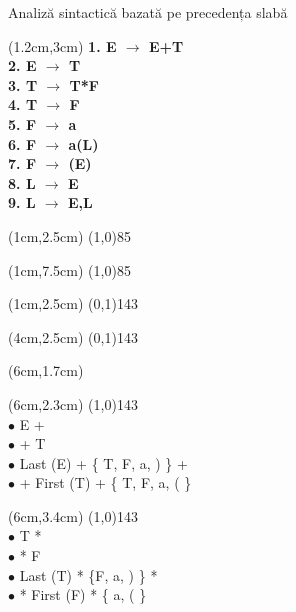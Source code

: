 \documentclass[pdf]{beamer}
\begin{document}
\begin{frame}{Analiză sintactică bazată pe precedența slabă}

\begin{textblock*}{16cm}(1.2cm,3cm)
\textbf
{1. E $\rightarrow$ E+T \\
2. E $\rightarrow$ T    \\
3. T $\rightarrow$ T*F  \\
4. T $\rightarrow$ F    \\ 
5. F $\rightarrow$ a    \\ 
6. F $\rightarrow$ a(L) \\
7. F $\rightarrow$ (E)   \\
8. L $\rightarrow$ E \\
9. L $\rightarrow$ E,L 
}
\end{textblock*}

\begin{textblock*}{16cm}(1cm,2.5cm)
\line(1,0){85}
\end{textblock*}

\begin{textblock*}{16cm}(1cm,7.5cm)
\line(1,0){85}
\end{textblock*}

\begin{textblock*}{16cm}(1cm,2.5cm)
\line(0,1){143}
\end{textblock*}

\begin{textblock*}{16cm}(4cm,2.5cm)
\line(0,1){143}
\end{textblock*}

\begin{textblock*}{16cm}(6cm,1.7cm)
\footnotesize
\textbf{}
\end{textblock*}

\begin{textblock*}{16cm}(6cm,2.3cm) 
\tiny
\line(1,0){143} \\ 
$\bullet$ E {\color{red}{=}} + \\
$\bullet$ + {\color{red}{=}} T \\ 
$\bullet$ Last (E) {\color{red}{$>$}} + \hspace{12mm} \{ T, F, a, ) \} {\color{red}{$>$}} +\\ 
$\bullet$ + {\color{red}{$<$}} First (T) \hspace{12mm} + {\color{red}{$<$}} \{ T, F, a, ( \}
\end{textblock*}

\begin{textblock*}{16cm}(6cm,3.4cm) 
\tiny
\line(1,0){143} \\ 
$\bullet$ T {\color{red}{=}} * \\
$\bullet$ * {\color{red}{=}} F \\ 
$\bullet$ Last (T) {\color{red}{$>$}} * \hspace{12mm} \{F, a, ) \} {\color{red}{$>$}} * \\ 
$\bullet$ * {\color{red}{$<$}} First (F) \hspace{12mm} * {\color{red}{$<$}} \{ a, ( \}
\end{textblock*}


\end{frame}
\end{document}
